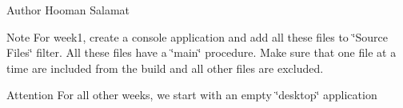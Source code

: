 \begin{DoxyAuthor}{Author}
Hooman Salamat
\end{DoxyAuthor}
\begin{DoxyNote}{Note}
For week1, create a console application and add all these files to \char`\"{}\+Source Files\char`\"{} filter. All these files have a \char`\"{}main\char`\"{} procedure. Make sure that one file at a time are included from the build and all other files are excluded.
\end{DoxyNote}
\begin{DoxyAttention}{Attention}
For all other weeks, we start with an empty \char`\"{}desktop\char`\"{} application 
\end{DoxyAttention}
